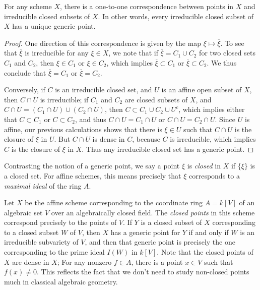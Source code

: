\begin{theorem}
    For any scheme $X$, there is a one-to-one correspondence between points in $X$ and irreducible closed subsets of $X$. In other words, every irreducible closed subset of $X$ has a unique generic point.
\end{theorem}
\begin{proof}
    One direction of this correspondence is given by the map $\xi \mapsto \overline{\xi}$. To see that $\overline{\xi}$ is irreducible for any $\xi \in X$, we note that if $\overline{\xi} = C_1 \cup C_2$ for two closed sets $C_1$ and $C_2$, then $\xi \in C_1$ or $\xi \in C_2$, which implies $\overline{\xi} \subset C_1$ or $\overline{\xi} \subset C_2$. We thus conclude that $\overline{\xi} = C_1$ or $\overline{\xi} = C_2$.

    Conversely, if $C$ is an irreducible closed set, and $U$ is an affine open subset of $X$, then $C \cap U$ is irreducible; if $C_1$ and $C_2$ are closed subsets of $X$, and $C \cap U = (C_1 \cap U) \cup (C_2 \cap U)$, then $C \subset C_1 \cup C_2 \cup U^c$, which implies either that $C \subset C_1$ or $C \subset C_2$, and thus $C \cap U = C_1 \cap U$ or $C \cap U = C_2 \cap U$. Since $U$ is affine, our previous calculations shows that there is $\xi \in U$ such that $C \cap U$ is the closure of $\xi$ in $U$. But $C \cap U$ is dense in $C$, because $C$ is irreducible, which implies $C$ is the closure of $\xi$ in $X$. Thus any irreducible closed set has a generic point.
\end{proof}

Contrasting the notion of a generic point, we say a point $\xi$ is \emph{closed} in $X$ if $\{ \xi \}$ is a closed set. For affine schemes, this means precisely that $\xi$ corresponds to a \emph{maximal ideal} of the ring $A$.

\begin{example}
    Let $X$ be the affine scheme corresponding to the coordinate ring $A = k[V]$ of an algebraic set $V$ over an algebraically closed field. The \emph{closed points} in this scheme correspond precisely to the points of $V$. If $Y$ is a closed subset of $X$ corresponding to a closed subset $W$ of $V$, then $X$ has a generic point for $Y$ if and only if $W$ is an irreducible subvariety of $V$, and then that generic point is precisely the one corresponding to the prime ideal $I(W)$ in $k[V]$. Note that the closed points of $X$ are dense in $X$; For any nonzero $f \in A$, there is a point $x \in V$ such that $f(x) \neq 0$. This reflects the fact that we don't need to study non-closed points much in classical algebraic geometry.
\end{example}


